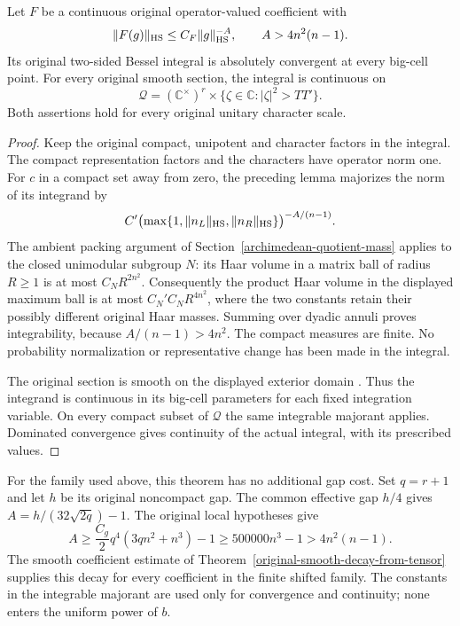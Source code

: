 \begin{theorem}\label{original-big-cell-continuity}
Let $F$ be a continuous original operator-valued coefficient with
\[
                  \|F(g)\|_{\rm HS}\le C_F\|g\|_{\rm HS}^{-A},
             \qquad A>4n^2(n-1).
\]
Its original two-sided Bessel integral is absolutely convergent
at every big-cell point. For every original smooth section,
the integral is continuous on
\[
 \mathcal Q=(\mathbb C^\times)^r
             \times\{\zeta\in\mathbb C:|\zeta|^2>TT'\}.
\]
Both assertions hold for every original unitary character scale.
\end{theorem}

\begin{proof}
Keep the original compact, unipotent and character factors in
the integral. The compact representation factors and the
characters have operator norm one.
For $c$ in a compact set away from zero, the preceding lemma
majorizes the norm of its integrand by
\[
 C'\bigl(\max\{1,\|n_L\|_{\rm HS},\|n_R\|_{\rm HS}\}\bigr)^{-A/(n-1)} .
\]
The ambient packing argument of
Section~\ref{archimedean-quotient-mass} applies to the closed
unimodular subgroup $N$: its Haar volume in a matrix ball of radius
$R\ge1$ is at most $C_NR^{2n^2}$.
Consequently the product Haar volume in the displayed maximum ball
is at most $C_N'C_NR^{4n^2}$, where the two constants retain their
possibly different original Haar masses.
Summing over dyadic annuli proves integrability, because
$A/(n-1)>4n^2$. The compact measures are finite.
No probability normalization or representative change has been
made in the integral.

The original section is smooth on the displayed exterior domain
\cite{big-cell-continuity-source}. Thus the integrand is continuous
in its big-cell parameters for each fixed integration variable.
On every compact subset of $\mathcal Q$ the same integrable
majorant applies. Dominated convergence gives continuity of the
actual integral, with its prescribed values.
\end{proof}

For the family used above, this theorem has no additional gap cost.
Set $q=r+1$ and let $h$ be its original noncompact gap.
The common effective gap $h/4$ gives
$A=h/(32\sqrt{2q})-1$. The original local hypotheses give
\[
 A\ge \frac{C_g}{2}q^4(3qn^2+n^3)-1
       \ge 500000n^3-1>4n^2(n-1).
\]
The smooth coefficient estimate of
Theorem~\ref{original-smooth-decay-from-tensor} supplies this
decay for every coefficient in the finite shifted family.
The constants in the integrable majorant are used only for
convergence and continuity; none enters the uniform power of $b$.

